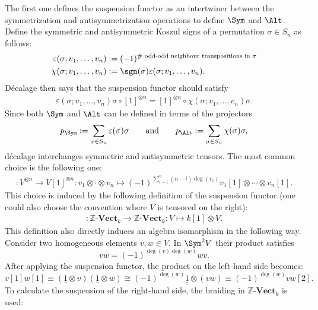 \begin{remark}
        The first one defines the suspension functor as an intertwiner between the symmetrization and antisymmetrization operations to define $\Sym$ and $\Alt$. Define the symmetric and antisymmetric Koszul signs of a permutation $\sigma\in S_n$ as follows:
        \begin{align}
            \varepsilon(\sigma;v_1,\ldots,v_n) &:= (-1)^{\#\text{ odd-odd neighbour transpositions in }\sigma}\\
            \chi(\sigma;v_1,\ldots,v_n) &:= \sgn(\sigma)\varepsilon(\sigma;v_1,\ldots,v_n).
        \end{align}
        D\'ecalage then says that the suspension functor should satisfy
        \begin{gather}
            \varepsilon(\sigma;v_1,\ldots,v_n)\sigma\circ[1]^{\otimes n} = [1]^{\otimes n}\circ\chi(\sigma;v_1,\ldots,v_n)\sigma.
        \end{gather}
        Since both $\Sym$ and $\Alt$ can be defined in terms of the projectors
        \begin{gather}
            p_{\Sym}:=\sum_{\sigma\in S_n}\varepsilon(\sigma)\sigma\qquad\text{and}\qquad p_{\Alt}:=\sum_{\sigma\in S_n}\chi(\sigma)\sigma,
        \end{gather}
        d\'ecalage interchanges symmetric and antisymmetric tensors. The most common choice is the following one:
        \begin{gather}
            [1]:V^{\otimes n}\rightarrow V[1]^{\otimes n}:v_1\otimes\cdot\otimes v_n\mapsto(-1)^{\sum_{i=1}^n(n-i)\deg(v_i)}v_1[1]\otimes\cdots\otimes v_n[1].
        \end{gather}
        This choice is induced by the following definition of the suspension functor (one could also choose the convention where $V$ is tensored on the right):
        \begin{gather}
            [1]:\mathbb{Z}\text{-}\mathbf{Vect}_k\rightarrow\mathbb{Z}\text{-}\mathbf{Vect}_k:V\mapsto k[1]\otimes V.
        \end{gather}
        This definition also directly induces an algebra isomorphism in the following way. Consider two homogeneous elements $v,w\in V$. In $\Sym^2V$ their product satisfies \[vw = (-1)^{\deg(v)\deg(w)}wv.\] After applying the suspension functor, the product on the left-hand side becomes: \[v[1]w[1]\equiv(\underline{1}\otimes v)(\underline{1}\otimes w) \cong (-1)^{\deg(w)}\underline{\underline{1}}\otimes(vw)\equiv(-1)^{\deg(w)}vw[2].\] To calculate the suspension of the right-hand side, the braiding in $\mathbb{Z}\text{-}\mathbf{Vect}_k$ is used:

\end{remark}
